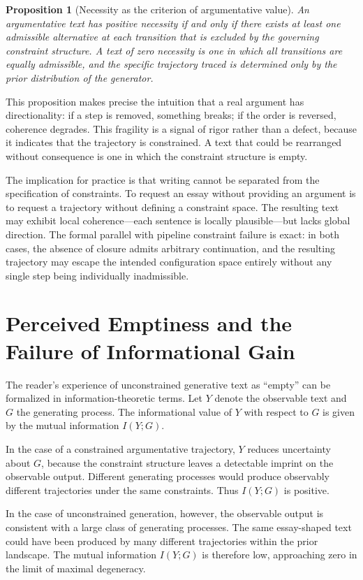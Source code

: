 \documentclass[12pt, oneside]{article}
\theoremstyle{plain}
\newtheorem{proposition}[theorem]{Proposition}
\theoremstyle{definition}
\theoremstyle{remark}
\begin{document}
\begin{proposition}[Necessity as the criterion of argumentative value]
An argumentative text has positive necessity if and only if there exists at least one
admissible alternative at each transition that is excluded by the governing constraint
structure. A text of zero necessity is one in which all transitions are equally admissible,
and the specific trajectory traced is determined only by the prior distribution of the
generator.
\end{proposition}

This proposition makes precise the intuition that a real argument has directionality: if
a step is removed, something breaks; if the order is reversed, coherence degrades. This
fragility is a signal of rigor rather than a defect, because it indicates that the
trajectory is constrained. A text that could be rearranged without consequence is one in
which the constraint structure is empty.

The implication for practice is that writing cannot be separated from the specification of
constraints. To request an essay without providing an argument is to request a trajectory
without defining a constraint space. The resulting text may exhibit local coherence---each
sentence is locally plausible---but lacks global direction. The formal parallel with
pipeline constraint failure is exact: in both cases, the absence of closure admits arbitrary
continuation, and the resulting trajectory may escape the intended configuration space
entirely without any single step being individually inadmissible.

\section{Perceived Emptiness and the Failure of Informational Gain}

The reader's experience of unconstrained generative text as ``empty'' can be formalized in
information-theoretic terms. Let $Y$ denote the observable text and $G$ the generating
process. The informational value of $Y$ with respect to $G$ is given by the mutual information
$I(Y; G)$.

In the case of a constrained argumentative trajectory, $Y$ reduces uncertainty about $G$,
because the constraint structure leaves a detectable imprint on the observable output.
Different generating processes would produce observably different trajectories under the
same constraints. Thus $I(Y; G)$ is positive.

In the case of unconstrained generation, however, the observable output is consistent with
a large class of generating processes. The same essay-shaped text could have been produced
by many different trajectories within the prior landscape. The mutual information
$I(Y; G)$ is therefore low, approaching zero in the limit of maximal degeneracy.
\end{document}
